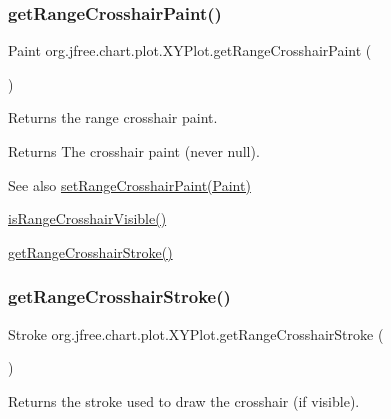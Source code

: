 \subsubsection{\texorpdfstring{get\+Range\+Crosshair\+Paint()}{getRangeCrosshairPaint()}}
{\footnotesize\ttfamily Paint org.\+jfree.\+chart.\+plot.\+X\+Y\+Plot.\+get\+Range\+Crosshair\+Paint (\begin{DoxyParamCaption}{ }\end{DoxyParamCaption})}

Returns the range crosshair paint.

\begin{DoxyReturn}{Returns}
The crosshair paint (never {\ttfamily null}).
\end{DoxyReturn}
\begin{DoxySeeAlso}{See also}
\mbox{\hyperlink{classorg_1_1jfree_1_1chart_1_1plot_1_1_x_y_plot_abea680edc849d51e1dfab077c33e8c61}{set\+Range\+Crosshair\+Paint(\+Paint)}} 

\mbox{\hyperlink{classorg_1_1jfree_1_1chart_1_1plot_1_1_x_y_plot_a141d93dd4ffb2ed0a73aa37e745ed9ee}{is\+Range\+Crosshair\+Visible()}} 

\mbox{\hyperlink{classorg_1_1jfree_1_1chart_1_1plot_1_1_x_y_plot_a0df9848d6644ca9e10d4b4221c53afa1}{get\+Range\+Crosshair\+Stroke()}} 
\end{DoxySeeAlso}
\mbox{\label{classorg_1_1jfree_1_1chart_1_1plot_1_1_x_y_plot_a0df9848d6644ca9e10d4b4221c53afa1}} 
\subsubsection{\texorpdfstring{get\+Range\+Crosshair\+Stroke()}{getRangeCrosshairStroke()}}
{\footnotesize\ttfamily Stroke org.\+jfree.\+chart.\+plot.\+X\+Y\+Plot.\+get\+Range\+Crosshair\+Stroke (\begin{DoxyParamCaption}{ }\end{DoxyParamCaption})}

Returns the stroke used to draw the crosshair (if visible).

